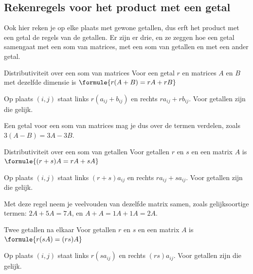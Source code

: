 \begin{oefeningen}
\end{oefeningen}

\subsection{Rekenregels voor het product met een getal}

Ook hier reken je op elke plaats met gewone getallen, dus erft het product met een getal de regels van de getallen. Er zijn er drie, en ze zeggen hoe een getal samengaat met een som van matrices, met een som van getallen en met een ander getal.

\begin{theorie}
\begin{stelling}{Distributiviteit over een som van matrices}
Voor een getal $r$ en matrices $A$ en $B$ met dezelfde dimensie is \qquad $\formule{r(A + B) = rA + rB}$
\end{stelling}

\begin{bewijs}
Op plaats $(i, j)$ staat links $r(a_{ij} + b_{ij})$ en rechts $ra_{ij} + rb_{ij}$. Voor getallen zijn die gelijk.
\end{bewijs}
\end{theorie}

Een getal voor een som van matrices mag je dus over de termen verdelen, zoals $3(A - B) = 3A - 3B$.

\begin{theorie}
\begin{stelling}{Distributiviteit over een som van getallen}
Voor getallen $r$ en $s$ en een matrix $A$ is \qquad $\formule{(r + s)A = rA + sA}$
\end{stelling}

\begin{bewijs}
Op plaats $(i, j)$ staat links $(r + s)a_{ij}$ en rechts $ra_{ij} + sa_{ij}$. Voor getallen zijn die gelijk.
\end{bewijs}
\end{theorie}

Met deze regel neem je veelvouden van dezelfde matrix samen, zoals gelijksoortige termen: $2A + 5A = 7A$, en $A + A = 1A + 1A = 2A$.

\begin{theorie}
\begin{stelling}{Twee getallen na elkaar}
Voor getallen $r$ en $s$ en een matrix $A$ is \qquad $\formule{r(sA) = (rs)A}$
\end{stelling}

\begin{bewijs}
Op plaats $(i, j)$ staat links $r(sa_{ij})$ en rechts $(rs)a_{ij}$. Voor getallen zijn die gelijk.
\end{bewijs}
\end{theorie}

